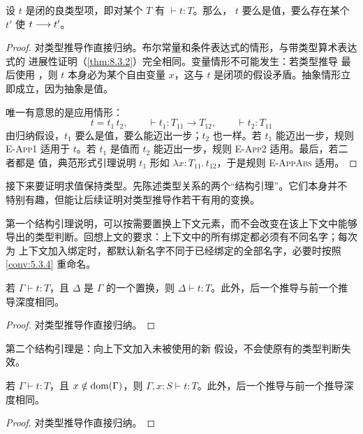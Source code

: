 \begin{theorem}[进展性]
\label{thm:9.3.5}
设 \(t\) 是闭的良类型项，即对某个 \(T\) 有 \(\vdash t:T\)。那么，
\(t\) 要么是值，要么存在某个 \(t'\) 使 \(t\mathrel{\longrightarrow} t'\)。
\end{theorem}

\begin{proof}
对类型推导作直接归纳。布尔常量和条件表达式的情形，与带类型算术表达式的
进展性证明（\cref{thm:8.3.2}）完全相同。变量情形不可能发生：若类型推导
最后使用 ，则 \(t\) 本身必为某个自由变量 \(x\)，这与
\(t\) 是闭项的假设矛盾。抽象情形立即成立，因为抽象是值。

唯一有意思的是应用情形：
\[
t=t_1\,t_2,\qquad
\vdash t_1:T_{11}\to T_{12},\qquad
\vdash t_2:T_{11}
\]
由归纳假设，\(t_1\) 要么是值，要么能迈出一步；\(t_2\) 也一样。若
\(t_1\) 能迈出一步，规则 \textsc{E-App1} 适用于 \(t\)。若 \(t_1\)
是值而 \(t_2\) 能迈出一步，规则 \textsc{E-App2} 适用。最后，若二者都是
值，典范形式引理说明 \(t_1\) 形如
\(\lambda x:T_{11}.\,t_{12}\)，于是规则 \textsc{E-AppAbs} 适用。
\end{proof}

接下来要证明求值保持类型。先陈述类型关系的两个“结构引理”。它们本身并不
特别有趣，但能让后续证明对类型推导作若干有用的变换。

第一个结构引理说明，可以按需要置换上下文元素，而不会改变在该上下文中能够
导出的类型判断。回想上文的要求：上下文中的所有绑定都必须有不同名字；每次为
上下文加入绑定时，都默认新名字不同于已经绑定的全部名字，必要时按照
\cref{conv:5.3.4} 重命名。

\begin{lemma}[置换]
\label{lem:9.3.6}
若 \(\Gamma\vdash t:T\)，且 \(\Delta\) 是 \(\Gamma\) 的一个置换，则
\(\Delta\vdash t:T\)。此外，后一个推导与前一个推导深度相同。
\end{lemma}

\begin{proof}
对类型推导作直接归纳。
\end{proof}

第二个结构引理是：向上下文加入未被使用的新
假设，不会使原有的类型判断失效。

\begin{lemma}[弱化]
\label{lem:9.3.7}
若 \(\Gamma\vdash t:T\)，且 \(x\notin\operatorname{dom}(\Gamma)\)，则
\(\Gamma,x:S\vdash t:T\)。此外，后一个推导与前一个推导深度相同。
\end{lemma}

\begin{proof}
对类型推导作直接归纳。
\end{proof}

